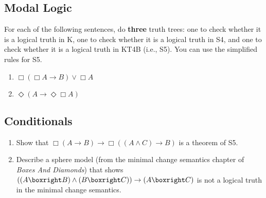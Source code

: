 \documentclass[
  11pt,
]{article}
\providecommand{\tightlist}{%
  \setlength{\itemsep}{0pt}\setlength{\parskip}{0pt}}
\begin{document}
\hypertarget{modal-logic}{%
\subsection{Modal Logic}\label{modal-logic}}

For each of the following sentences, do \textbf{three} truth trees: one
to check whether it is a logical truth in K, one to check whether it is
a logical truth in S4, and one to check whether it is a logical truth in
KT4B (i.e., S5). You can use the simplified rules for S5.

\begin{enumerate}
\def\labelenumi{\arabic{enumi}.}
\setcounter{enumi}{14}
\tightlist
\item
  \(\Box(\Box A \rightarrow B) \vee \Box A\)
\item
  \(\Diamond(A \rightarrow \Diamond \Box A)\)
\end{enumerate}

\hypertarget{conditionals}{%
\subsection{Conditionals}\label{conditionals}}

\begin{enumerate}
\def\labelenumi{\arabic{enumi}.}
\setcounter{enumi}{16}
\tightlist
\item
  Show that
  \(\Box (A \rightarrow B) \rightarrow \Box ((A \wedge C) \rightarrow B)\)
  is a theorem of S5.
\item
  Describe a sphere model (from the minimal change semantics chapter of
  \emph{Boxes And Diamonds}) that shows
  \(((A \boxright B) \wedge (B \boxright C)) \rightarrow (A \boxright C)\)
  is not a logical truth in the minimal change semantics.
\end{enumerate}
\end{document}
